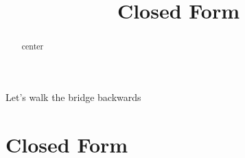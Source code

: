 \documentclass{ximera}
\title{Closed Form}
\begin{document}
\begin{abstract}
center
\end{abstract}
\maketitle






Let's walk the bridge backwards



\section{Closed Form}
\end{document}

